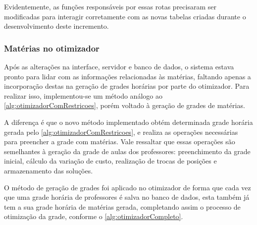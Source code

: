 Evidentemente, as funções responsáveis por essas rotas precisaram ser modificadas para interagir corretamente com as novas tabelas criadas durante o desenvolvimento deste incremento.

\subsubsection{Matérias no otimizador}
Após as alterações na interface, servidor e banco de dados, o sistema estava pronto para lidar com as informações relacionadas às matérias, faltando apenas a incorporação destas na geração de grades horárias por parte do otimizador. Para realizar isso, implementou-se um método análogo ao \autoref{alg:otimizadorComRestricoes}, porém voltado à geração de grades de matérias.

A diferença é que o novo método implementado obtém determinada grade horária gerada pelo \autoref{alg:otimizadorComRestricoes}, e realiza as operações necessárias para preencher a grade com matérias. Vale ressaltar que essas operações são semelhantes à geração da grade de aulas dos professores: preenchimento da grade inicial, cálculo da variação de custo, realização de trocas de posições e armazenamento das soluções.

O método de geração de grades foi aplicado no otimizador de forma que cada vez que uma grade horária de professores é salva no banco de dados, esta também já tem a sua grade horária de matérias gerada, completando assim o processo de otimização da grade, conforme o \autoref{alg:otimizadorCompleto}.

